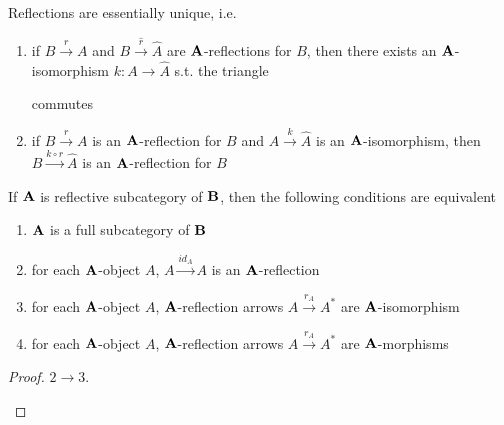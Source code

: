 \documentclass[11pt]{article}
\begin{document}
\begin{proposition}[]
Reflections are essentially unique, i.e.
\begin{enumerate}
\item if \(B\xrightarrow{r}A\) and \(B\xrightarrow{\hat{r}}\hat{A}\) are
\(\operatorname{\textbf{A}}\)-reflections for \(B\), then there exists an \(\operatorname{\textbf{A}}\)-isomorphism
\(k:A\to\hat{A}\) s.t. the triangle
\begin{center}\end{center}
commutes
\item if \(B\xrightarrow{r}A\) is an \(\operatorname{\textbf{A}}\)-reflection for \(B\) and
\(A\xrightarrow{k}\hat{A}\) is an \(\operatorname{\textbf{A}}\)-isomorphism, then
\(B\xrightarrow{k\circ r}\hat{A}\) is an \(\operatorname{\textbf{A}}\)-reflection for \(B\)
\end{enumerate}
\end{proposition}

\begin{proposition}[]
\label{prop4.20}
If \(\operatorname{\textbf{A}}\) is reflective subcategory of \(\operatorname{\textbf{B}}\), then the following
conditions are equivalent
\begin{enumerate}
\item \(\operatorname{\textbf{A}}\) is a full subcategory of \(\operatorname{\textbf{B}}\)
\item for each \(\operatorname{\textbf{A}}\)-object \(A\), \(A\xrightarrow{id_A}A\) is an \(\operatorname{\textbf{A}}\)-reflection
\item for each \(\operatorname{\textbf{A}}\)-object \(A\), \(\operatorname{\textbf{A}}\)-reflection arrows
\(A\xrightarrow{r_A}A^*\) are \(\operatorname{\textbf{A}}\)-isomorphism
\item for each \(\operatorname{\textbf{A}}\)-object \(A\), \(\operatorname{\textbf{A}}\)-reflection arrows
\(A\xrightarrow{r_A}A^*\) are \(\operatorname{\textbf{A}}\)-morphisms
\end{enumerate}
\end{proposition}

\begin{proof}
\(2\to3\).
\begin{center}\end{center}
\end{proof}
\end{document}
